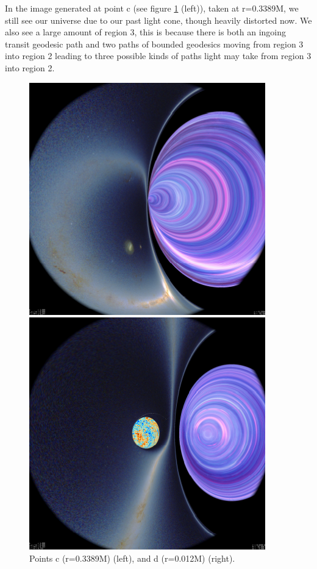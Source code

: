 \documentclass[oneside,openright,frontopenright, singlespacing]{dmathesis}
\begin{document}
	In the image generated at point c (see figure \ref{fig:Figure6.5} (left)), taken at r=0.3389M, we still see our universe due to our past light cone, though heavily distorted now. We also see a large amount of region 3, this is because there is both an ingoing transit geodesic path and two paths of bounded geodesics moving from region 3 into region 2 leading to three possible kinds of paths light may take from region 3 into region 2.

\begin{figure}[!ht]
	\centering
	\begin{minipage}{0.5\textwidth}
		\centering
		\includegraphics[width=0.75\linewidth]{img/plunging3}
	\end{minipage}%
	\hfill
	\begin{minipage}{0.5\textwidth}
		\centering
		\includegraphics[width=0.75\linewidth]{img/plunging4}
	\end{minipage}
	\caption{Points c (r=0.3389M) (left), and d (r=0.012M) (right).}
	\label{fig:Figure6.5}
\end{figure}
\end{document}
